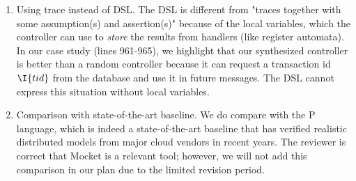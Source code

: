 \begin{enumerate}
    \item Using trace instead of DSL. The DSL is different from "traces together with some assumption(s) and assertion(s)" because of the local variables, which the controller can use to \emph{store} the results from handlers (like register automata). In our case study (lines 961-965), we highlight that our synthesized controller is better than a random controller because it can request a transaction id $\I{tid}$ from the database and use it in future messages. The DSL cannot express this situation without local variables.
    \item Comparison with state-of-the-art baseline. We do compare with the P language, which is indeed a state-of-the-art baseline that has verified realistic distributed models from major cloud vendors in recent years. The reviewer is correct that Mocket is a relevant tool; however, we will not add this comparison in our plan due to the limited revision period.
\end{enumerate}

